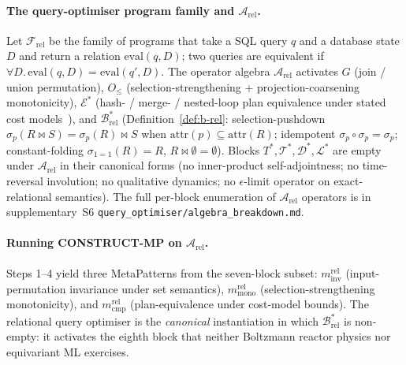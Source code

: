\documentclass[acmsmall, screen]{acmart}
\begin{document}
\paragraph{The query-optimiser program family and $\mathcal{A}_{\mathrm{rel}}$.}
Let $\mathcal{F}_{\mathrm{rel}}$ be the family of programs that take a SQL query $q$ and a database state $D$ and return a relation $\mathrm{eval}(q, D)$; two queries are equivalent if $\forall D.\,\mathrm{eval}(q, D) = \mathrm{eval}(q', D)$. The operator algebra $\mathcal{A}_{\mathrm{rel}}$ activates $G$ (join / union permutation), $O_{\le}$ (selection-strengthening + projection-coarsening monotonicity), $\mathcal{E}^{*}$ (hash- / merge- / nested-loop plan equivalence under stated cost models~\cite{Wang2024QED, Markl2022LearnedQO}), and $\mathcal{B}^{*}_{\mathrm{rel}}$ (Definition~\ref{def:b-rel}: selection-pushdown $\sigma_p(R \bowtie S) = \sigma_p(R) \bowtie S$ when $\mathrm{attr}(p) \subseteq \mathrm{attr}(R)$; idempotent $\sigma_p \circ \sigma_p = \sigma_p$; constant-folding $\sigma_{1=1}(R) = R$, $R \bowtie \emptyset = \emptyset$). Blocks $T^{*}, \mathcal{T}^{*}, \mathcal{D}^{*}, \mathcal{L}^{*}$ are empty under $\mathcal{A}_{\mathrm{rel}}$ in their canonical forms (no inner-product self-adjointness; no time-reversal involution; no qualitative dynamics; no $\epsilon$-limit operator on exact-relational semantics). The full per-block enumeration of $\mathcal{A}_{\mathrm{rel}}$ operators is in supplementary~S6 \texttt{query\_optimiser/algebra\_breakdown.md}.

\paragraph{Running CONSTRUCT-MP on $\mathcal{A}_{\mathrm{rel}}$.}
Steps 1--4 yield three MetaPatterns from the seven-block subset: $m^{\mathrm{rel}}_{\mathrm{inv}}$ (input-permutation invariance under set semantics), $m^{\mathrm{rel}}_{\mathrm{mono}}$ (selection-strengthening monotonicity), and $m^{\mathrm{rel}}_{\mathrm{cmp}}$ (plan-equivalence under cost-model bounds). The relational query optimiser is the \emph{canonical} instantiation in which $\mathcal{B}^{*}_{\mathrm{rel}}$ is non-empty: it activates the eighth block that neither Boltzmann reactor physics nor equivariant ML exercises.
\end{document}
